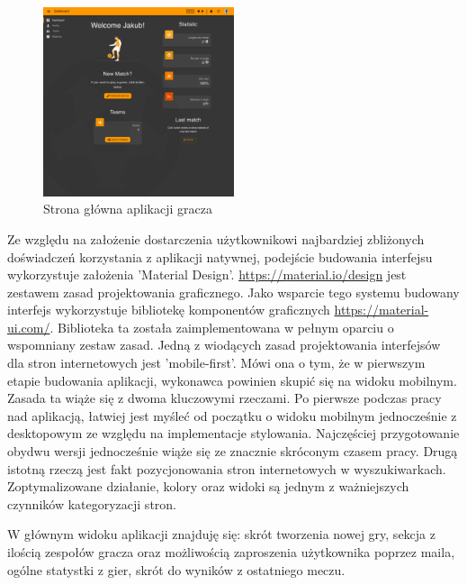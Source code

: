 \begin{figure}[h!]
  \centering
    \includegraphics[width=0.5\textwidth]{images/player/dashboard.png}
  \caption{Strona główna aplikacji gracza}
  \label{fig:mobile}
\end{figure}

Ze względu na założenie dostarczenia użytkownikowi najbardziej zbliżonych doświadczeń korzystania z aplikacji natywnej, podejście budowania interfejsu wykorzystuje założenia 'Material Design'. \href{Material Design}{https://material.io/design} jest zestawem zasad projektowania graficznego. Jako wsparcie tego systemu budowany interfejs wykorzystuje bibliotekę komponentów graficznych \href{Material-UI}{https://material-ui.com/}. Biblioteka ta została zaimplementowana w pełnym oparciu o wspomniany zestaw zasad. Jedną z wiodących zasad projektowania interfejsów dla stron internetowych jest 'mobile-first'. Mówi ona o tym, że w pierwszym etapie budowania aplikacji, wykonawca powinien skupić się na widoku mobilnym. Zasada ta wiąże się z dwoma kluczowymi rzeczami. Po pierwsze podczas pracy nad aplikacją, łatwiej jest myśleć od początku o widoku mobilnym jednocześnie z desktopowym ze względu na implementacje stylowania. Najczęściej przygotowanie obydwu wersji jednocześnie wiąże się ze znacznie skróconym czasem pracy. Drugą istotną rzeczą jest fakt pozycjonowania stron internetowych w wyszukiwarkach. Zoptymalizowane działanie, kolory oraz widoki są jednym z ważniejszych czynników kategoryzacji stron.

W głównym widoku aplikacji znajduję się: skrót tworzenia nowej gry, sekcja z ilością zespołów gracza oraz możliwością zaproszenia użytkownika poprzez maila, ogólne statystki z gier, skrót do wyników z ostatniego meczu.

